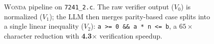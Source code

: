 \documentclass[10pt]{article}
\begin{document}
\begin{figure}[ht!]
\caption{\textsc{Wonda} pipeline on \texttt{7241\_2.c}. The raw verifier output ($V_0$) is normalized ($V_1$); the LLM then merges parity-based case splits into a single linear inequality ($V_2$): \texttt{a >= 0 \&\& a * n <= b}, a $65\times$ character reduction with \textbf{4.3$\times$} verification speedup.}
\label{fig:pipeline_showcase_7241_2_c}
\end{figure}
\end{document}
